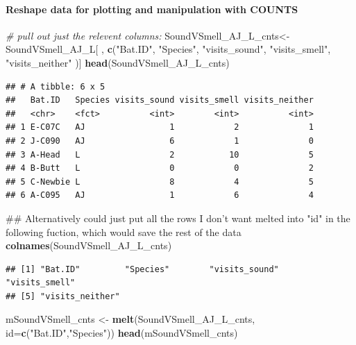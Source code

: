\documentclass[]{article}
\newenvironment{Shaded}{\begin{snugshade}}{\end{snugshade}}
\newcommand{\KeywordTok}[1]{\textcolor[rgb]{0.13,0.29,0.53}{\textbf{{#1}}}}
\newcommand{\DataTypeTok}[1]{\textcolor[rgb]{0.13,0.29,0.53}{{#1}}}
\newcommand{\StringTok}[1]{\textcolor[rgb]{0.31,0.60,0.02}{{#1}}}
\newcommand{\CommentTok}[1]{\textcolor[rgb]{0.56,0.35,0.01}{\textit{{#1}}}}
\newcommand{\NormalTok}[1]{{#1}}
\let\oldparagraph\paragraph
\renewcommand{\paragraph}[1]{\oldparagraph{#1}\mbox{}}
\begin{document}
\paragraph{Reshape data for plotting and manipulation with
COUNTS}\label{reshape-data-for-plotting-and-manipulation-with-counts-2}

\begin{Shaded}
\begin{Highlighting}[]
\CommentTok{# pull out just the relevent columns: }
\NormalTok{SoundVSmell_AJ_L_cnts<-}\StringTok{ }\NormalTok{SoundVSmell_AJ_L[ , }\KeywordTok{c}\NormalTok{(}\StringTok{"Bat.ID"}\NormalTok{, }\StringTok{"Species"}\NormalTok{, }\StringTok{"visits_sound"}\NormalTok{, }\StringTok{"visits_smell"}\NormalTok{, }\StringTok{"visits_neither"} \NormalTok{)]}
\KeywordTok{head}\NormalTok{(SoundVSmell_AJ_L_cnts)}
\end{Highlighting}
\end{Shaded}

\begin{verbatim}
## # A tibble: 6 x 5
##   Bat.ID   Species visits_sound visits_smell visits_neither
##   <chr>    <fct>          <int>        <int>          <int>
## 1 E-C07C   AJ                 1            2              1
## 2 J-C090   AJ                 6            1              0
## 3 A-Head   L                  2           10              5
## 4 B-Butt   L                  0            0              2
## 5 C-Newbie L                  8            4              5
## 6 A-C095   AJ                 1            6              4
\end{verbatim}

\begin{Shaded}
\begin{Highlighting}[]
\NormalTok{## Alternatively could just put all the rows I don't want melted into "id" in the following fuction, which would save the rest of the data}
\KeywordTok{colnames}\NormalTok{(SoundVSmell_AJ_L_cnts)}
\end{Highlighting}
\end{Shaded}

\begin{verbatim}
## [1] "Bat.ID"         "Species"        "visits_sound"   "visits_smell"  
## [5] "visits_neither"
\end{verbatim}

\begin{Shaded}
\begin{Highlighting}[]
\NormalTok{mSoundVSmell_cnts <-}\StringTok{ }\KeywordTok{melt}\NormalTok{(SoundVSmell_AJ_L_cnts, }\DataTypeTok{id=}\KeywordTok{c}\NormalTok{(}\StringTok{"Bat.ID"}\NormalTok{,}\StringTok{"Species"}\NormalTok{))}
\KeywordTok{head}\NormalTok{(mSoundVSmell_cnts)}
\end{Highlighting}
\end{Shaded}
\end{document}
